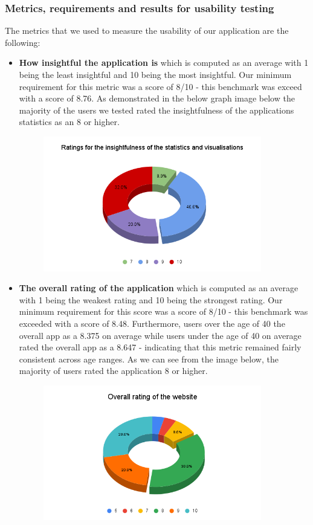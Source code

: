 \documentclass[12pt]{article}
\begin{document}
\subsubsection{Metrics, requirements and results for usability testing}
The metrics that we used to measure the usability of our application are the following:

\begin{itemize}
    \item \textbf{How insightful the application is} which is computed as an average with 1 being the least insightful and 10 being the most insightful. Our minimum requirement for this metric was a score of 8/10 - this benchmark was exceed with a score of 8.76. As demonstrated in the below graph image below the majority of the users we tested rated the insightfulness of the applications statistics as an 8 or higher.
          \begin{figure}[H]
              \centering
              \includegraphics[width=0.9\textwidth]{piechart.png}
          \end{figure}
    \item \textbf{The overall rating of the application} which is computed as an average with 1 being the weakest rating and 10 being the strongest rating. Our minimum requirement for this score was a score of 8/10 - this benchmark was exceeded with a score of 8.48. Furthermore, users over the age of 40 the overall app as a 8.375 on average while users under the age of 40 on average rated the overall app as a 8.647 - indicating that this metric remained fairly consistent across age ranges. As we can see from the image below, the majority of users rated the application 8 or higher.
          \begin{figure}[H]
              \centering
              \includegraphics[width=0.9\textwidth]{Overall rating of the website.png}

\end{figure}
\end{itemize}
\end{document}
